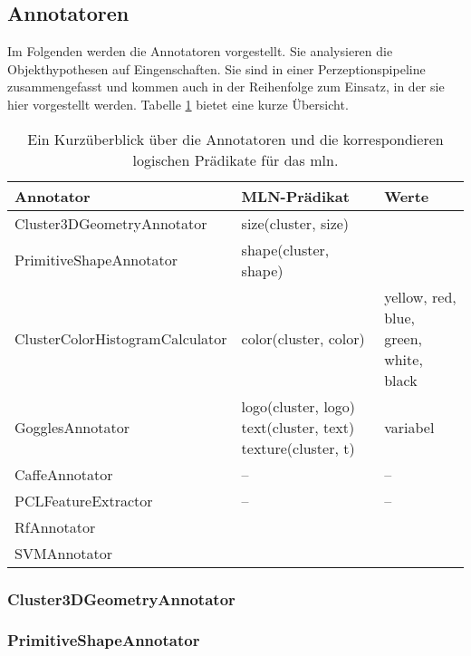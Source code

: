 \subsection{Annotatoren}

Im Folgenden werden die Annotatoren vorgestellt. Sie analysieren die Objekthypothesen auf Eingenschaften.  Sie sind in einer Perzeptionspipeline zusammengefasst und kommen auch in der Reihenfolge zum Einsatz, in der sie hier vorgestellt werden. Tabelle \ref{tab:annotators} bietet eine kurze Übersicht.

\begin{table}
\begin{tabularx}{\textwidth}{lXX}
\textbf{Annotator}				& \textbf{MLN-Prädikat}	& \textbf{Werte}	\\ \hline 
Cluster3DGeometryAnnotator		& size(cluster, size)	&		\\ \hline 
PrimitiveShapeAnnotator			& shape(cluster, shape)	&		\\ \hline 
ClusterColorHistogramCalculator  & color(cluster, color)	& yellow, red, blue, green, white, black \\ \hline 
GogglesAnnotator				& logo(cluster, logo) \newline text(cluster, text) \newline texture(cluster, t) \newline \todo{???mehr}	& 	variabel	\\ \hline 
CaffeAnnotator					& --					& --	\\ \hline 
PCLFeatureExtractor				& --					& --	\\ \hline 
RfAnnotator						& \todo{?}				&		\\ \hline 
SVMAnnotator					&\todo{?}				&		\\ \hline 
\end{tabularx}
\caption{Ein Kurzüberblick über die Annotatoren und die korrespondieren logischen Prädikate für das \gls{mln}.}
\label{tab:annotators}
\end{table}

\subsubsection{Cluster3DGeometryAnnotator}

\subsubsection{PrimitiveShapeAnnotator} 
   
